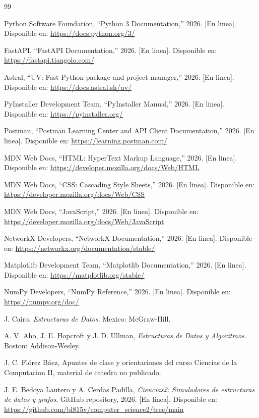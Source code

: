 \documentclass[12pt,onecolumn]{IEEEtran}
\begin{document}
\begin{thebibliography}{99}

Python Software Foundation, ``Python 3 Documentation,'' 2026. [En linea]. Disponible en: \url{https://docs.python.org/3/}

FastAPI, ``FastAPI Documentation,'' 2026. [En linea]. Disponible en: \url{https://fastapi.tiangolo.com/}

Astral, ``UV: Fast Python package and project manager,'' 2026. [En linea]. Disponible en: \url{https://docs.astral.sh/uv/}

PyInstaller Development Team, ``PyInstaller Manual,'' 2026. [En linea]. Disponible en: \url{https://pyinstaller.org/}

Postman, ``Postman Learning Center and API Client Documentation,'' 2026. [En linea]. Disponible en: \url{https://learning.postman.com/}

MDN Web Docs, ``HTML: HyperText Markup Language,'' 2026. [En linea]. Disponible en: \url{https://developer.mozilla.org/docs/Web/HTML}

MDN Web Docs, ``CSS: Cascading Style Sheets,'' 2026. [En linea]. Disponible en: \url{https://developer.mozilla.org/docs/Web/CSS}

MDN Web Docs, ``JavaScript,'' 2026. [En linea]. Disponible en: \url{https://developer.mozilla.org/docs/Web/JavaScript}

NetworkX Developers, ``NetworkX Documentation,'' 2026. [En linea]. Disponible en: \url{https://networkx.org/documentation/stable/}

Matplotlib Development Team, ``Matplotlib Documentation,'' 2026. [En linea]. Disponible en: \url{https://matplotlib.org/stable/}

NumPy Developers, ``NumPy Reference,'' 2026. [En linea]. Disponible en: \url{https://numpy.org/doc/}

J. Cairo, \textit{Estructuras de Datos}. Mexico: McGraw-Hill.

A. V. Aho, J. E. Hopcroft y J. D. Ullman, \textit{Estructuras de Datos y Algoritmos}. Boston: Addison-Wesley.

J. C. Flórez Báez, Apuntes de clase y orientaciones del curso Ciencias de la Computacion II, material de catedra no publicado.

J. E. Bedoya Lautero y A. Cerdas Padilla, 
\textit{Ciencias2: Simuladores de estructuras de datos y grafos}, 
GitHub repository, 2026. [En línea]. Disponible en: 
\url{https://github.com/bl815v/computer_science2/tree/main}

\end{thebibliography}
\end{document}

